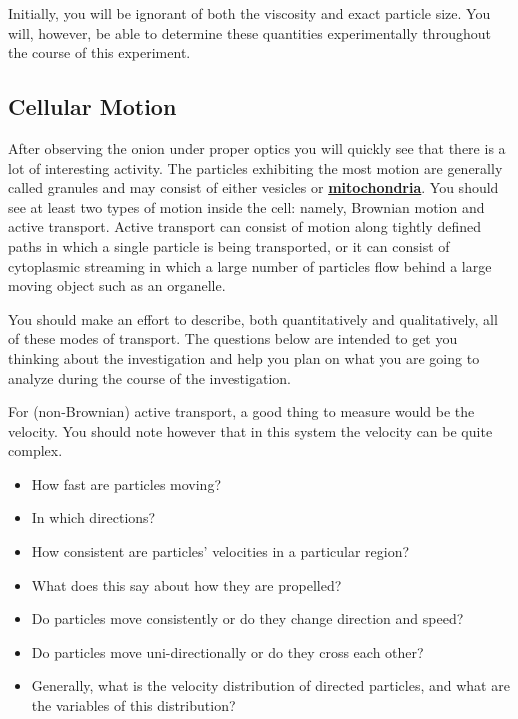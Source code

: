 \documentclass{../lab}
\begin{document}
Initially, you will be ignorant of both the viscosity and exact particle size. You will, however, be able to determine these quantities experimentally throughout the course of this experiment.

\subsection{Cellular Motion}

After observing the onion under proper optics you will quickly see that there is a lot of interesting activity. The particles exhibiting the most motion are generally called granules and may consist of either vesicles or \href{http://physics111.lib.berkeley.edu/Physics111/Reprints/OTZ/biowikipedia.pdf}{\textbf{mitochondria}}. You should see at least two types of motion inside the cell: namely, Brownian motion and active transport. Active transport can consist of motion along tightly defined paths in which a single particle is being transported, or it can consist of cytoplasmic streaming in which a large number of particles flow behind a large moving object such as an organelle.

You should make an effort to describe, both quantitatively and qualitatively, all of these modes of transport. The questions below are intended to get you thinking about the investigation and help you plan on what you are going to analyze during the course of the investigation.

For (non-Brownian) active transport, a good thing to measure would be the velocity. You should note however that in this system the velocity can be quite complex.

\begin{itemize}
    \item How fast are particles moving?

    \item In which directions?

    \item How consistent are particles' velocities in a particular region?

    \item What does this say about how they are propelled?

    \item Do particles move consistently or do they change direction and speed?

    \item Do particles move uni-directionally or do they cross each other?

    \item Generally, what is the velocity distribution of directed particles, and what are the variables of this distribution?
\end{itemize}
\end{document}
